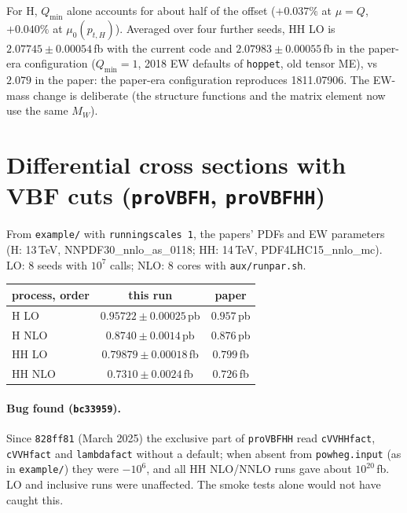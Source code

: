 \documentclass[11pt,a4paper]{article}
\newcommand{\provbfh}{\texttt{proVBFH}\xspace}
\newcommand{\provbfhh}{\texttt{proVBFHH}\xspace}
\newcommand{\hoppet}{\texttt{hoppet}\xspace}
\newcommand{\commit}[1]{\texttt{#1}}
\newcommand{\file}[1]{\texttt{#1}}
\begin{document}
\noindent For H, $Q_{\min}$ alone accounts for about half of the
offset ($+0.037\%$ at $\mu=Q$, $+0.040\%$ at $\mu_0(p_{t,H})$). Averaged
over four further seeds, HH LO is $2.07745\pm0.00054$\,fb with the
current code and $2.07983\pm0.00055$\,fb in the paper-era configuration
($Q_{\min}=1$, 2018 EW defaults of \hoppet, old tensor ME), vs $2.079$
in the paper: the paper-era configuration reproduces 1811.07906. The
EW-mass change is deliberate (the structure functions and the matrix
element now use the same $M_W$).

\section{\texorpdfstring{Differential cross sections with VBF cuts (\provbfh, \provbfhh)}{Differential cross sections with VBF cuts (proVBFH, proVBFHH)}}

From \file{example/} with \texttt{runningscales 1}, the papers' PDFs and
EW parameters (H: 13\,TeV, NNPDF30\_nnlo\_as\_0118; HH: 14\,TeV,
PDF4LHC15\_nnlo\_mc). LO: 8 seeds with $10^7$ calls; NLO: 8 cores
with \file{aux/runpar.sh}.

\begin{center}
\begin{tabular}{lcc}
\toprule
process, order & this run & paper\\
\midrule
H LO   & $0.95722\pm0.00025$\,pb & $0.957$\,pb\\
H NLO  & $0.8740\pm0.0014$\,pb   & $0.876$\,pb\\
HH LO  & $0.79879\pm0.00018$\,fb & $0.799$\,fb\\
HH NLO & $0.7310\pm0.0024$\,fb   & $0.726$\,fb\\
\bottomrule
\end{tabular}
\end{center}

\paragraph{Bug found (\commit{bc33959}).} Since \commit{828ff81} (March
2025) the exclusive part of \provbfhh read \texttt{cVVHHfact},
\texttt{cVVHfact} and \texttt{lambdafact} without a default; when absent
from \file{powheg.input} (as in \file{example/}) they were $-10^6$, and
all HH NLO/NNLO runs gave about $10^{20}$\,fb. LO and inclusive runs
were unaffected. The smoke tests alone would not have caught this.
\end{document}
